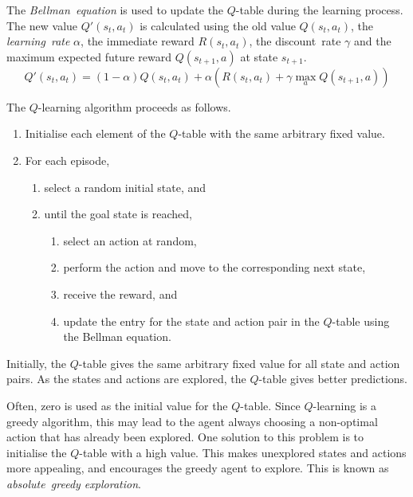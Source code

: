 The \emph{Bellman~equation} is used to update the \( Q \)-table during the learning process.
The new value \( Q'\!\left( s_{t}, a_{t} \right) \) is calculated using the old value \( Q\!\left( s_{t}, a_{t} \right) \), the \emph{learning~rate} \( \alpha \), the immediate reward \( R\!\left( s_{t}, a_{t} \right) \), the discount~rate \( \gamma \) and the maximum expected future reward \( Q\!\left( s_{t+1}, a \right) \) at state \( s_{t+1} \).
\begin{equation*}
  Q'\!\left( s_{t}, a_{t} \right) = \left( 1 - \alpha \right) Q\!\left( s_{t}, a_{t} \right) + \alpha \left( R\!\left( s_{t}, a_{t} \right) + \gamma \max_{a} Q\!\left( s_{t+1}, a \right) \right)
\end{equation*}

The \( Q \)-learning algorithm proceeds as follows.
\begin{enumerate}
  \item Initialise each element of the \( Q \)-table with the same arbitrary fixed value.
  \item For each episode,
  \begin{enumerate}
    \item select a random initial state, and
    \item until the goal state is reached,
    \begin{enumerate}
      \item select an action at random,
      \item perform the action and move to the corresponding next state,
      \item receive the reward, and
      \item update the entry for the state and action pair in the \( Q \)-table using the Bellman equation.
    \end{enumerate}
  \end{enumerate}
\end{enumerate}

Initially, the \( Q \)-table gives the same arbitrary fixed value for all state and action pairs.
As the states and actions are explored, the \( Q \)-table gives better predictions.

Often, zero is used as the initial value for the \( Q \)-table.
Since \( Q \)-learning is a greedy algorithm, this may lead to the agent always choosing a non-optimal action that has already been explored.
One solution to this problem is to initialise the \( Q \)-table with a high value.
This makes unexplored states and actions more appealing, and encourages the greedy agent to explore.
This is known as \emph{absolute~greedy exploration}.

